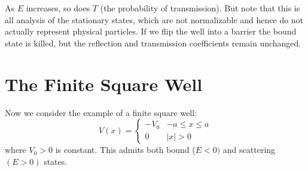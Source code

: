 \documentclass[12pt, a4paper, oneside, openright, titlepage]{book}
\begin{document}
As $E$ increases, so does $T$ (the probability of transmission). But note that this is all analysis of the stationary states, which are not normalizable and hence do not actually represent physical particles. If we flip the well into a barrier the bound state is killed, but the reflection and transmission coefficients remain unchanged.


\section{The Finite Square Well}

Now we consider the example of a finite square well: \begin{equation*}
    V(x) = \left\{\begin{array}{cc} -V_0 & -a\leq x \leq a \\ 0 & |x| > 0 \end{array}\right.
\end{equation*}
where $V_0 > 0$ is constant. This admits both bound ($E < 0)$ and scattering $(E > 0)$ states.
\end{document}
